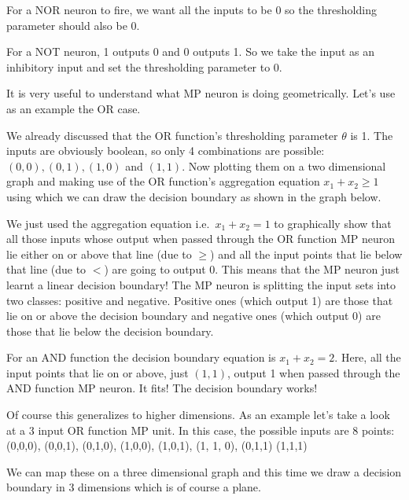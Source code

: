 \be
For a NOR neuron to fire, we want all the inputs to be 0 so the thresholding parameter should also be 0.


\ee

\be
For a NOT neuron, 1 outputs 0 and 0 outputs 1. So we take the input as an inhibitory input and set the thresholding
parameter to 0.


\ee

It is very useful to understand what MP neuron is doing geometrically. Let's use as an example the OR case.

\be
We already discussed that the OR function's thresholding parameter $\theta$ is 1. The inputs are obviously boolean,
so only 4 combinations are possible: $(0,0), (0,1), (1,0)$ and $(1,1)$. Now plotting them on a two dimensional graph
and making use of the OR function's aggregation equation $x_1 + x_2 \geq 1$ using which we can draw the decision
boundary as shown in the graph below.


We just used the aggregation equation i.e.\ $x_1 + x_2 = 1$ to graphically show that all those inputs whose output
when passed through the OR function MP neuron lie either on or above that line (due to $\geq$) and all the input
points that lie below that line (due to $<$) are going to output 0. This means that the MP neuron just learnt a
linear decision boundary! The MP neuron is splitting the input sets into two classes: positive and negative. Positive
ones (which output 1) are those that lie on or above the decision boundary and negative ones (which output 0) are
those that lie below the decision boundary.
\ee

\be
For an AND function the decision boundary equation is $x_1 + x_2 = 2$. Here, all the input points that lie on or
above, just $(1,1)$, output 1 when passed through the AND function MP neuron. It fits! The decision boundary works!


\ee

\be
Of course this generalizes to higher dimensions. As an example let's take a look at a 3 input OR function MP unit. In
this case, the possible inputs are 8 points:
\bse
(0,0,0), (0,0,1), (0,1,0), (1,0,0), (1,0,1), (1, 1, 0), (0,1,1) (1,1,1)
\ese


We can map these on a three dimensional graph and this time we draw a decision boundary in 3 dimensions which is of
course a plane.

